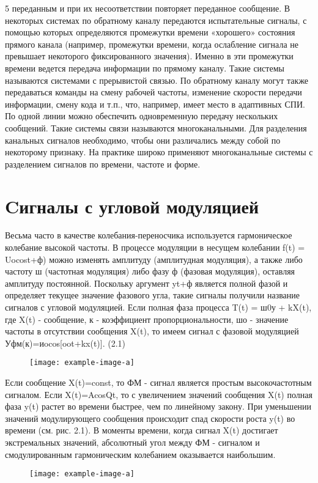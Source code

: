 ﻿\documentclass[a4paper,12pt]{article}
\begin{document}
5
переданным и при их несоответствии повторяет переданное сообщение.
В некоторых системах по обратному каналу передаются испытательные сигналы, с помощью которых определяются промежутки времени «хорошего» состояния прямого канала (например, промежутки времени, когда ослабление сигнала не превышает некоторого фиксированного значения). Именно в эти промежутки времени ведется передача информации по прямому каналу. Такие системы называются системами с прерывистой связью. По обратному каналу могут также передаваться команды на смену рабочей частоты, изменение скорости передачи информации, смену кода и т.п., что, например, имеет место в адаптивных СПИ.
По одной линии можно обеспечить одновременную передачу нескольких сообщений. Такие системы связи называются многоканальными. Для разделения канальных сигналов необходимо, чтобы они различались между собой по некоторому признаку. На практике широко применяют многоканальные системы с разделением сигналов по времени, частоте и форме.

\section{Cигналы с угловой модуляцией}
Весьма часто в качестве колебания-переносчика используется гармоническое колебание высокой частоты. В процессе модуляции в несущем колебании f(t) = Uocost+ф) можно изменять амплитуду (амплитудная модуляция), а также либо частоту ш (частотная модуляция) либо фазу ф (фазовая модуляция), оставляя амплитуду постоянной. Поскольку аргумент yt+ф является полной фазой и определяет текущее значение фазового угла, такие сигналы получили название сигналов с угловой модуляцией.
Если полная фаза процесса T(t) = ш0у + kX(t), где X(t) - сообщение, к -
коэффициент	пропорциональности,	шо -
значение частоты в отсутствии сообщения X(t), то имеем сигнал с фазовой модуляцией
Уфм(к)=иocos[oot+kx(t)].	(2.1)
\begin{figure}[H]
	\centering
	\texttt{[image: example-image-a]}
	\caption{}
\end{figure}
Если сообщение X(t)=const, то ФМ - сигнал является простым высокочастотным сигналом.
Если X(t)=AcosQt, то с увеличением значений сообщения X(t) полная фаза y(t) растет во времени быстрее, чем по линейному закону. При уменьшении значений модулирующего сообщения происходит спад скорости роста y(t) во времени (см. рис. 2.1).
В моменты времени, когда сигнал X(t) достигает экстремальных значений, абсолютный угол между ФМ - сигналом и смодулированным гармоническим колебанием оказывается наибольшим.
\begin{figure}[H]
	\centering
	\texttt{[image: example-image-a]}
	\caption{}
\end{figure}
\end{document}
